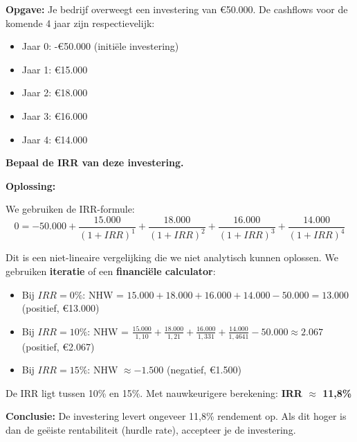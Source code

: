 \documentclass[a4paper,11pt]{article}
\begin{document}
\begin{oefenblok}[title=IRR Berekening]
    \textbf{Opgave:} Je bedrijf overweegt een investering van €50.000. 
    De cashflows voor de komende 4 jaar zijn respectievelijk:
    \begin{itemize}
        \item Jaar 0: -€50.000 (initiële investering)
        \item Jaar 1: €15.000
        \item Jaar 2: €18.000
        \item Jaar 3: €16.000
        \item Jaar 4: €14.000
    \end{itemize}
    
    \textbf{Bepaal de IRR van deze investering.}
    
    \vspace{5mm}
    
    \textbf{Oplossing:}
    
    We gebruiken de IRR-formule: 
    $$0 = -50.000 + \frac{15.000}{(1+IRR)^1} + \frac{18.000}{(1+IRR)^2} + \frac{16.000}{(1+IRR)^3} + \frac{14.000}{(1+IRR)^4}$$
    
    Dit is een niet-lineaire vergelijking die we niet analytisch kunnen oplossen. 
    We gebruiken \textbf{iteratie} of een \textbf{financiële calculator}:
    
    \begin{itemize}
        \item Bij $IRR = 0\%$: NHW = $15.000 + 18.000 + 16.000 + 14.000 - 50.000 = 13.000$ (positief, €13.000)
        \item Bij $IRR = 10\%$: NHW = $\frac{15.000}{1,10} + \frac{18.000}{1,21} + \frac{16.000}{1,331} + \frac{14.000}{1,4641} - 50.000 \approx 2.067$ (positief, €2.067)
        \item Bij $IRR = 15\%$: NHW $\approx -1.500$ (negatief, €1.500)
    \end{itemize}
    
    De IRR ligt tussen 10\% en 15\%. Met nauwkeurigere berekening: \textbf{IRR $\approx$ 11,8\%}
    
    \textbf{Conclusie:} De investering levert ongeveer 11,8\% rendement op. 
    Als dit hoger is dan de geëiste rentabiliteit (hurdle rate), accepteer je de investering.
\end{oefenblok}
\end{document}
